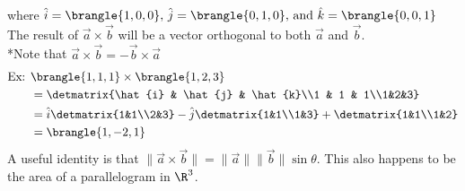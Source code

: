 where $\hat{i}=\brangle{1,0,0},\,\hat{j}=\brangle{0,1,0},\,\text{and }\hat{k}=\brangle{0,0,1}$\\
The result of $\vec{a}\times\vec{b}$ will be a vector orthogonal to both $\vec{a}$ and $\vec{b}$.\\
*Note that $\vec{a}\times\vec{b}=-\vec{b}\times\vec{a}$
\begin{align*}
    \text{Ex: }&\brangle{1,1,1}\times\brangle{1,2,3}\\
    &=\detmatrix{\hat{i} & \hat{j} & \hat{k}\\1 & 1 & 1\\1&2&3}\\
    &=\hat{i}\detmatrix{1&1\\2&3}-\hat{j}\detmatrix{1&1\\1&3}+\detmatrix{1&1\\1&2}\\
    &=\brangle{1,-2,1}
\end{align*}
A useful identity is that $\|\vec{a}\times\vec{b}\|=\|\vec{a}\|\|\vec{b}\|\sin\theta$. This also happens to be the area of a parallelogram in $\R^3$.
